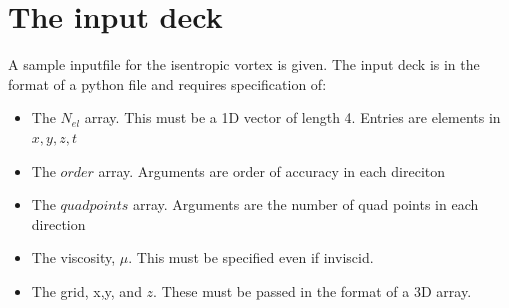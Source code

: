 \documentclass[times,12pt]{article}%
\begin{document}
\section{The input deck}
A sample inputfile for the isentropic vortex is given. The input deck is in the format of a python file and requires specification of:
\begin{itemize}
\item The $N_{el}$ array. This must be a 1D vector of length 4. Entries are elements in $x,y,z,t$
\item The $order$ array. Arguments are order of accuracy in each direciton
\item The $quadpoints$ array. Arguments are the number of quad points in each direction
\item The viscosity, $\mu$. This must be specified even if inviscid.
\item The grid, x,y, and $z$. These must be passed in the format of a 3D array.
\end{itemize}
\end{document}
